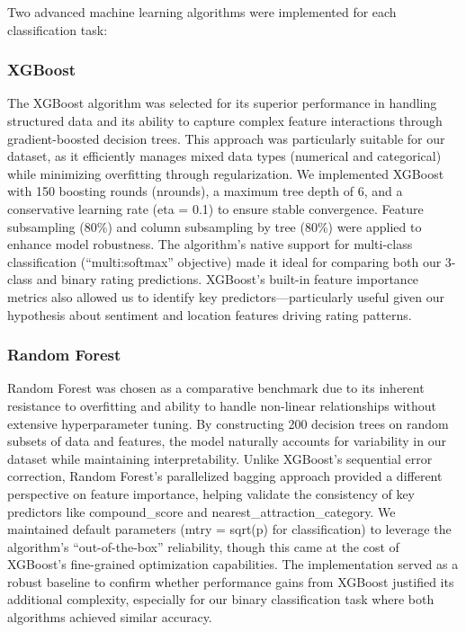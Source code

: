 \documentclass[
]{article}
\begin{document}
Two advanced machine learning algorithms were implemented for each
classification task:

\subsubsection{XGBoost}\label{xgboost}

The XGBoost algorithm was selected for its superior performance in
handling structured data and its ability to capture complex feature
interactions through gradient-boosted decision trees. This approach was
particularly suitable for our dataset, as it efficiently manages mixed
data types (numerical and categorical) while minimizing overfitting
through regularization. We implemented XGBoost with 150 boosting rounds
(nrounds), a maximum tree depth of 6, and a conservative learning rate
(eta = 0.1) to ensure stable convergence. Feature subsampling (80\%) and
column subsampling by tree (80\%) were applied to enhance model
robustness. The algorithm's native support for multi-class
classification (``multi:softmax'' objective) made it ideal for comparing
both our 3-class and binary rating predictions. XGBoost's built-in
feature importance metrics also allowed us to identify key
predictors---particularly useful given our hypothesis about sentiment
and location features driving rating patterns.

\subsubsection{Random Forest}\label{random-forest}

Random Forest was chosen as a comparative benchmark due to its inherent
resistance to overfitting and ability to handle non-linear relationships
without extensive hyperparameter tuning. By constructing 200 decision
trees on random subsets of data and features, the model naturally
accounts for variability in our dataset while maintaining
interpretability. Unlike XGBoost's sequential error correction, Random
Forest's parallelized bagging approach provided a different perspective
on feature importance, helping validate the consistency of key
predictors like compound\_score and nearest\_attraction\_category. We
maintained default parameters (mtry = sqrt(p) for classification) to
leverage the algorithm's ``out-of-the-box'' reliability, though this
came at the cost of XGBoost's fine-grained optimization capabilities.
The implementation served as a robust baseline to confirm whether
performance gains from XGBoost justified its additional complexity,
especially for our binary classification task where both algorithms
achieved similar accuracy.
\end{document}
